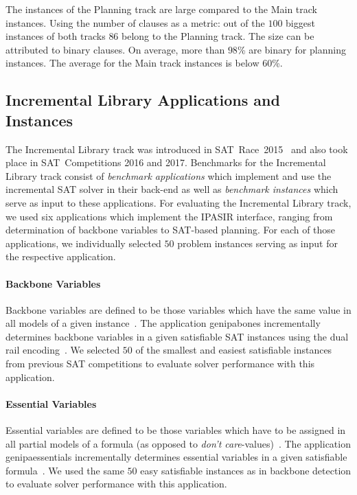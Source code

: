 \documentclass{elsarticle}
\begin{document}
The instances of the Planning track are large compared to the Main track
instances. Using the number of clauses as a metric: out of the $100$ biggest
instances of both tracks
$86$ belong to the Planning track. The size can be attributed to
binary clauses. On average, more than $98$\% are binary for
planning instances. The average for the Main track instances is below $60$\%.

\subsection{Incremental Library Applications and Instances}

The Incremental Library track was introduced in SAT~Race~2015~\cite{Balyo:2015:SATRace} and also took place in SAT~Competitions 2016 and 2017.
Benchmarks for the Incremental Library track consist of \emph{benchmark applications} which implement and use the incremental SAT solver in their back-end as well as \emph{benchmark instances} which serve as input to these applications. 
For evaluating the Incremental Library track, we used six applications which implement the IPASIR interface, ranging from determination of backbone variables to SAT-based planning. 
For each of those applications, we individually selected $50$ problem instances serving as input for the respective application. 

\paragraph{Backbone Variables}

Backbone variables are defined to be those variables which have the same value in all models of a given instance~\cite{Monasson:1999,Janota:2015:Backbones}. 
The application \textsf{genipabones} incrementally determines backbone variables in a given satisfiable SAT instances using the dual rail encoding~\cite{Balyo:2015:SATRace}.
We selected $50$ of the smallest and easiest satisfiable instances from previous SAT competitions to evaluate solver performance with this application. 

\paragraph{Essential Variables}

Essential variables are defined to be those variables which have to be assigned in all partial models of a formula (as opposed to \emph{don't care}-values)~\cite{Bryant:1987:Essentials}. 
The application \textsf{genipaessentials} incrementally determines essential variables in a given satisfiable formula~\cite{Balyo:2015:SATRace}. 
We used the same $50$ easy satisfiable instances as in backbone detection to evaluate solver performance with this application. 
\end{document}
